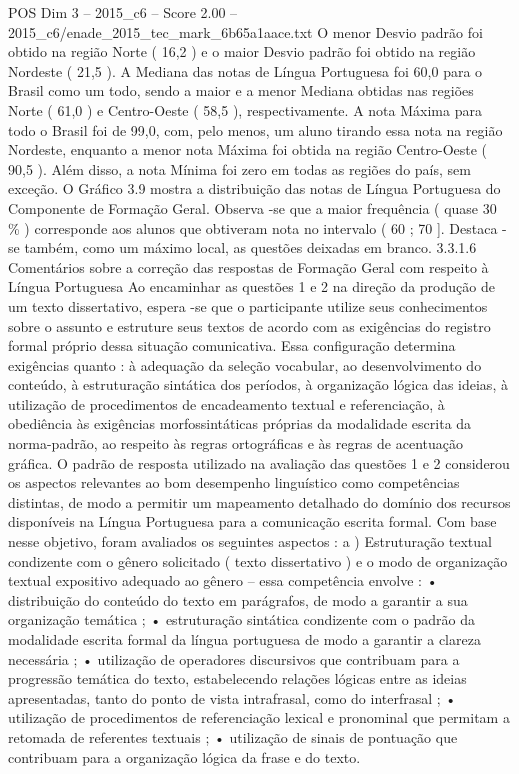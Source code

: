 \begin{textsample}{POS Dim 3 – 2015\_c6 – Score 2.00 – 2015\_c6/enade\_2015\_tec\_mark\_6b65a1aace.txt}
O menor Desvio padrão foi obtido na região Norte ( 16,2 ) e o maior Desvio padrão foi obtido na região Nordeste ( 21,5 ).
A Mediana das notas de Língua Portuguesa foi 60,0 para o Brasil como um todo, sendo a maior e a menor Mediana obtidas nas regiões Norte ( 61,0 ) e Centro-Oeste ( 58,5 ), respectivamente.
A nota Máxima para todo o Brasil foi de 99,0, com, pelo menos, um aluno tirando essa nota na região Nordeste, enquanto a menor nota Máxima foi obtida na região Centro-Oeste ( 90,5 ).
Além disso, a nota Mínima foi zero em todas as regiões do país, sem exceção.
O Gráfico 3.9 mostra a distribuição das notas de Língua Portuguesa do Componente de Formação Geral.
Observa -se que a maior frequência ( quase 30 \% ) corresponde aos alunos que obtiveram nota no intervalo ( 60 ; 70 ].
Destaca -se também, como um máximo local, as questões deixadas em branco. 3.3.1.6 Comentários sobre a correção das respostas de Formação Geral com respeito à Língua Portuguesa Ao encaminhar as questões 1 e 2 na direção da produção de um texto dissertativo, espera -se que o participante utilize seus conhecimentos sobre o assunto e estruture seus textos de acordo com as exigências do registro formal próprio dessa situação comunicativa.
Essa configuração determina exigências quanto : à adequação da seleção vocabular, ao desenvolvimento do conteúdo, à estruturação sintática dos períodos, à organização lógica das ideias, à utilização de procedimentos de encadeamento textual e referenciação, à obediência às exigências morfossintáticas próprias da modalidade escrita da norma-padrão, ao respeito às regras ortográficas e às regras de acentuação gráfica.
O padrão de resposta utilizado na avaliação das questões 1 e 2 considerou os aspectos relevantes ao bom desempenho linguístico como competências distintas, de modo a permitir um mapeamento detalhado do domínio dos recursos disponíveis na Língua Portuguesa para a comunicação escrita formal.
Com base nesse objetivo, foram avaliados os seguintes aspectos : a ) Estruturação textual condizente com o gênero solicitado ( texto dissertativo ) e o modo de organização textual expositivo adequado ao gênero – essa competência envolve : • distribuição do conteúdo do texto em parágrafos, de modo a garantir a sua organização temática ; • estruturação sintática condizente com o padrão da modalidade escrita formal da língua portuguesa de modo a garantir a clareza necessária ; • utilização de operadores discursivos que contribuam para a progressão temática do texto, estabelecendo relações lógicas entre as ideias apresentadas, tanto do ponto de vista intrafrasal, como do interfrasal ; • utilização de procedimentos de referenciação lexical e pronominal que permitam a retomada de referentes textuais ; • utilização de sinais de pontuação que contribuam para a organização lógica da frase e do texto.

\end{textsample}
